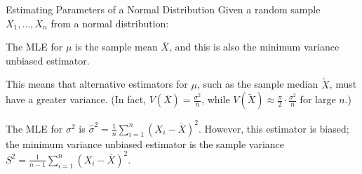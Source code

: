 \documentclass{beamer}
\renewcommand{\emph}{\textbf}
\begin{document}
\begin{frame}{Estimating Parameters of a Normal Distribution}
Given a random sample $X_1,\dots, X_n$ from a normal distribution:
\begin{block}{}
The MLE for $\mu$ is the sample mean $\overline{X}$, and this is also the minimum variance unbiased estimator.
\end{block}
This means that alternative estimators for $\mu$, such as the sample median $\tilde X$, must have a greater variance. (In fact, $V(\overline{X})=\frac{\sigma^2}n$, while $V(\tilde X) \approx \frac\pi2\cdot \frac{\sigma^2}n$ for large $n$.)

\begin{block}{}
The MLE for $\sigma^2$ is $\hat{\sigma}^2=\frac1{n}\sum_{i=1}^n (X_i-\overline X)^2$. However, this estimator is biased; the minimum variance unbiased estimator is the sample variance $S^2=\frac1{n-1}\sum_{i=1}^n (X_i-\overline X)^2$.
\end{block}

%
%
\end{frame}
\end{document}
